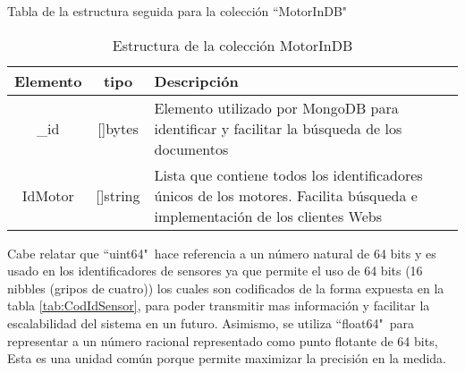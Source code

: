 \vspace{1cm}


    \begin{table}[ht]
        \begin{center}
            Tabla de la estructura seguida para la colección ``MotorInDB"\ \\
            \vspace{0.3cm}
            \begin{tabular}{|c|c|p{11cm}|}
                \hline
                Elemento & tipo     & Descripción \\\hline\hline
                \_id      & []bytes  & Elemento utilizado por MongoDB para
                identificar y facilitar la búsqueda de los documentos\\\hline
                IdMotor  & []string & Lista que contiene todos los identificadores
                únicos de los motores. Facilita búsqueda e implementación de los
                clientes Webs\\\hline
            \end{tabular}
        \end{center}
        \caption[Estructura de MotorInDB]{Estructura de la colección MotorInDB}
        \label{tab:MotorInDBbson}
    \end{table}

    Cabe relatar que ``uint64"\  hace referencia a un número natural de 64 bits
    y es usado en los identificadores de sensores ya que permite el uso de 64
    bits (16 nibbles (gripos de cuatro)) los cuales son codificados de
    la forma expuesta en la tabla \ref{tab:CodIdSensor}, para
    poder transmitir mas información y facilitar la escalabilidad del sistema en
    un futuro.
    Asimismo, se utiliza
    ``float64"\ para representar  a un número racional representado como punto
    flotante de 64 bits, Esta es una unidad común porque permite maximizar la
    precisión en la medida.

